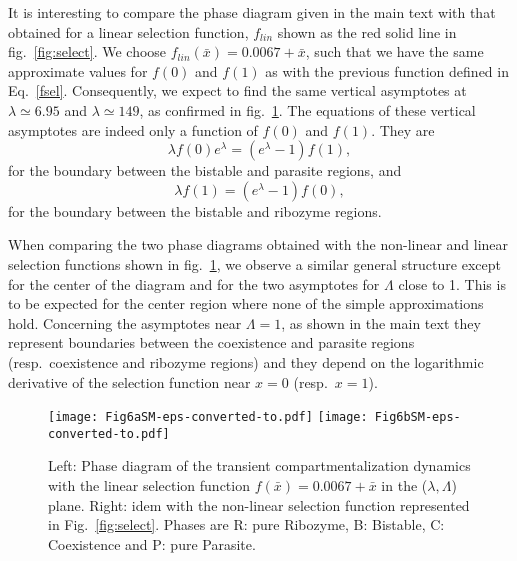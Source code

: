 \documentclass[twocolumn,showpacs,floatfix]{revtex4-1}
\newcommand{\be}{\begin{equation}}
\newcommand{\ee}{\end{equation}}
\begin{document}
\begin{thebibliography}{99}
\begin{widetext}
It is interesting to compare the phase diagram given in the main text with that obtained for a linear selection function, $f_{lin}$
shown as the red solid line in fig.~\ref{fig:select}. 
We choose $f_{lin}(\bar{x})=0.0067+\bar{x}$, such that we have the same approximate values for $f(0)$ and $f(1)$ as with the previous 
function defined in Eq.~\eqref{fsel}. 
Consequently, we expect to find the same vertical asymptotes at $\lambda \simeq 6.95$ and $\lambda \simeq 149$, as confirmed in 
fig.~\ref{fig:phase diag}. The equations of these vertical asymptotes are indeed only a function of $f(0)$ and $f(1)$. They are
\be
\lambda f(0) e^{\lambda} = ( e^{\lambda}-1 ) f(1),
\ee
for the boundary between the bistable and parasite regions, and 
\be
\lambda f(1)  = ( e^{\lambda}-1 ) f(0),
\ee
for the boundary between the bistable and ribozyme regions.

When comparing the two phase diagrams obtained with the non-linear and linear selection functions shown in fig.~\ref{fig:phase diag},
we observe a similar general structure except for the center of the diagram and for the two asymptotes for $\Lambda$ close to 1.
This is to be expected for the center region where none of the simple approximations hold.
Concerning the asymptotes near $\Lambda=1$, as shown in the main text they represent 
boundaries between the coexistence and parasite regions
(resp.\ coexistence and ribozyme regions) and they 
depend on the logarithmic derivative of the selection function near $x=0$ (resp.\ $x=1$).
 
\begin{figure}
\begin{center}
\texttt{[image: Fig6aSM-eps-converted-to.pdf]}
\texttt{[image: Fig6bSM-eps-converted-to.pdf]}
\end{center}
\caption{Left: Phase diagram of the transient compartmentalization dynamics with the linear selection function $f(\bar{x})=0.0067+\bar{x}$ in
 the ($\lambda,\Lambda$) plane. Right: idem with the non-linear selection function represented in Fig.~\ref{fig:select}.
Phases are R: pure Ribozyme, B: Bistable, C: Coexistence and P: pure Parasite.
 }
\label{fig:phase diag}
\end{figure}
\vskip 100pt
\end{widetext}

\end{thebibliography}
\end{document}
